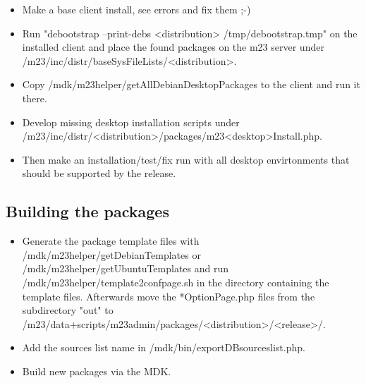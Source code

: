 \begin{itemize}
\item Make a base client install, see errors and fix them ;-)

\item Run "debootstrap --print-debs <distribution> /tmp/debootstrap.tmp" on the installed client and place the found packages on the m23 server under /m23/inc/distr/baseSysFileLists/<distribution>.

\item Copy /mdk/m23helper/getAllDebianDesktopPackages to the client and run it there.

\item Develop missing desktop installation scripts under /m23/inc/distr/<distribution>/packages/m23<desktop>Install.php.

\item Then make an installation/test/fix run with all desktop envirtonments that should be supported by the release.
\end{itemize}



\subsection{Building the packages}
\begin{itemize}
\item Generate the package template files with /mdk/m23helper/getDebianTemplates or /mdk/m23helper/getUbuntuTemplates and run /mdk/m23helper/template2confpage.sh in the directory containing the template files. Afterwards move the *OptionPage.php files from the subdirectory "out" to /m23/data+scripts/m23admin/packages/<distribution>/<release>/.

\item Add the sources list name in /mdk/bin/exportDBsourceslist.php.

\item Build new packages via the MDK.
\end{itemize}